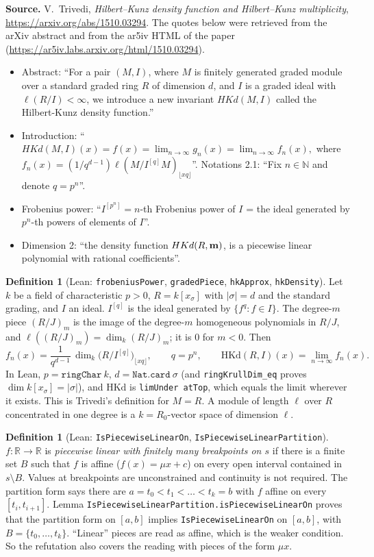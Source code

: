 \documentclass[11pt]{article}
\theoremstyle{definition}
\newtheorem{definition}[theorem]{Definition}
\theoremstyle{remark}
\newcommand{\HKd}{\mathrm{HKd}}
\begin{document}
\textbf{Source.} V.~Trivedi, \emph{Hilbert--Kunz density function and Hilbert--Kunz multiplicity},
\url{https://arxiv.org/abs/1510.03294}. The quotes below were retrieved from the arXiv abstract and from the ar5iv
HTML of the paper (\url{https://ar5iv.labs.arxiv.org/html/1510.03294}).
\begin{itemize}
\item Abstract: ``For a pair $(M, I)$, where $M$ is finitely generated graded module over a standard graded ring $R$
of dimension $d$, and $I$ is a graded ideal with $\ell(R/I) < \infty$, we introduce a new invariant $HKd(M, I)$ called
the Hilbert-Kunz density function.''
\item Introduction: ``$HKd(M,I)(x)=f(x)=\lim_{n\to\infty}g_{n}(x)=\lim_{n\to\infty}f_{n}(x),$ where
$f_{n}(x)=(1/q^{d-1})\ell(M/I^{[q]}M)_{\lfloor xq\rfloor}$''. Notations 2.1: ``Fix $n\in\mathbb{N}$ and denote
$q=p^{n}$''.
\item Frobenius power: ``$I^{[p^{n}]}=n$-th Frobenius power of $I$ = the ideal generated by $p^{n}$-th powers of
elements of $I$''.
\item Dimension 2: ``the density function $HKd(R,{\bf m})$, is a piecewise linear polynomial with rational
coefficients''.
\end{itemize}

\begin{definition}[Lean: \texttt{frobeniusPower}, \texttt{gradedPiece}, \texttt{hkApprox}, \texttt{hkDensity}]
Let $k$ be a field of characteristic $p>0$, $R=k[x_\sigma]$ with $|\sigma|=d$ and the standard grading, and $I$ an ideal.
$I^{[q]}$ is the ideal generated by $\{f^q: f\in I\}$. The degree-$m$ piece $(R/J)_m$ is the image of the degree-$m$
homogeneous polynomials in $R/J$, and $\ell((R/J)_m)=\dim_k (R/J)_m$; it is $0$ for $m<0$. Then
\[ f_n(x)=\frac{1}{q^{d-1}}\,\dim_k\bigl(R/I^{[q]}\bigr)_{\lfloor xq\rfloor},\qquad q=p^n,\qquad
\HKd(R,I)(x)=\lim_{n\to\infty} f_n(x). \]
In Lean, $p=\texttt{ringChar}\ k$, $d=\texttt{Nat.card}\ \sigma$ (and \texttt{ringKrullDim\_eq} proves
$\dim k[x_\sigma]=|\sigma|$), and $\HKd$ is \texttt{limUnder atTop}, which equals the limit wherever it exists. This
is Trivedi's definition for $M=R$. A module of length $\ell$ over $R$ concentrated in one degree is a
$k=R_0$-vector space of dimension $\ell$.
\end{definition}

\begin{definition}[Lean: \texttt{IsPiecewiseLinearOn}, \texttt{IsPiecewiseLinearPartition}]
$f:\mathbb{R}\to\mathbb{R}$ is \emph{piecewise linear with finitely many breakpoints on $s$} if there is a finite set
$B$ such that $f$ is affine ($f(x)=\mu x+c$) on every open interval contained in $s\setminus B$. Values at breakpoints
are unconstrained and continuity is not required. The partition form says there are
$a=t_0<t_1<\dots<t_k=b$ with $f$ affine on every $[t_i,t_{i+1}]$. Lemma
\texttt{IsPiecewiseLinearPartition.isPiecewiseLinearOn} proves that the partition form on $[a,b]$ implies
\texttt{IsPiecewiseLinearOn} on $[a,b]$, with $B=\{t_0,\dots,t_k\}$. ``Linear'' pieces are read as affine, which is the
weaker condition. So the refutation also covers the reading with pieces of the form $\mu x$.
\end{definition}
\end{document}
